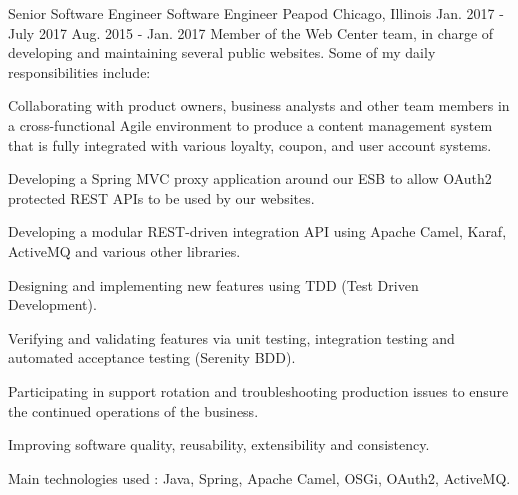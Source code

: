 \begin{cventries}
  \cventryfour
    {Senior Software Engineer} %
    {Software Engineer} %
    {Peapod} %
    {Chicago, Illinois} %
    {Jan. 2017 - July 2017} %
    {Aug. 2015 - Jan. 2017} %
    {Member of the Web Center team, in charge of developing and maintaining several public websites. Some of my daily responsibilities include:} %
    {
    \begin{cvitems}
  \item Collaborating with product owners, business analysts and other team members in a cross-functional Agile environment to produce a content management system that is fully integrated with various loyalty, coupon, and user account systems.
  \item Developing a Spring MVC proxy application around our ESB to allow OAuth2 protected REST APIs to be used by our websites.
  \item Developing a modular REST-driven integration API using Apache Camel, Karaf, ActiveMQ and various other libraries.
  \item Designing and implementing new features using TDD (Test Driven Development).
  \item Verifying and validating features via unit testing, integration testing and automated acceptance testing (Serenity BDD).
  \item Participating in support rotation and troubleshooting production issues to ensure the continued operations of the business.
  \item Improving software quality, reusability, extensibility and consistency.
  \item Main technologies used : Java, Spring, Apache Camel, OSGi, OAuth2, ActiveMQ.
\end{cvitems}
    } %


\end{cventries}
